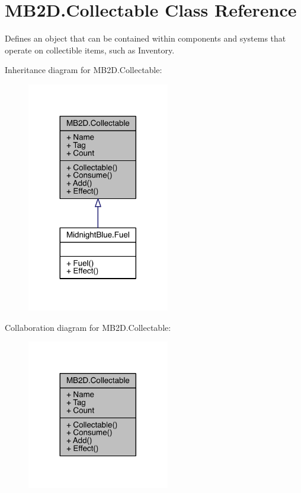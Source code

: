 \hypertarget{class_m_b2_d_1_1_collectable}{}\section{M\+B2\+D.\+Collectable Class Reference}
\label{class_m_b2_d_1_1_collectable}


Defines an object that can be contained within components and systems that operate on collectible items, such as Inventory.  




Inheritance diagram for M\+B2\+D.\+Collectable\+:
\nopagebreak
\begin{figure}[H]
\begin{center}
\leavevmode
\includegraphics[width=176pt]{class_m_b2_d_1_1_collectable__inherit__graph}
\end{center}
\end{figure}


Collaboration diagram for M\+B2\+D.\+Collectable\+:
\nopagebreak
\begin{figure}[H]
\begin{center}
\leavevmode
\includegraphics[width=176pt]{class_m_b2_d_1_1_collectable__coll__graph}
\end{center}
\end{figure}
